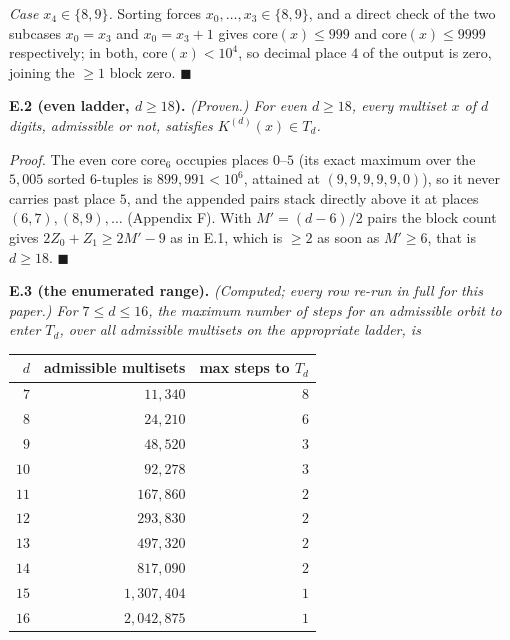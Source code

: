 \documentclass[11pt,letterpaper]{article}
\theoremstyle{paperstyle}
\theoremstyle{paperstyledef}
\theoremstyle{paperstylerem}
\begin{document}
\emph{Case \(x_4 \in \{8, 9\}\).} Sorting forces \(x_0, \dots, x_3 \in \{8, 9\}\), and a direct check of the two subcases \(x_0 = x_3\) and \(x_0 = x_3 + 1\) gives \(\mathrm{core}(x) \leq 999\) and \(\mathrm{core}(x) \leq 9999\) respectively; in both, \(\mathrm{core}(x) < 10^4\), so decimal place \(4\) of the output is zero, joining the \(\geq 1\) block zero. \(\blacksquare\)

\textbf{E.2 (even ladder, \(d \geq 18\)).} \emph{(Proven.) For even \(d \geq 18\), every multiset \(x\) of \(d\) digits, admissible or not, satisfies \(K^{(d)}(x) \in T_d\).}

\emph{Proof.} The even core \(\mathrm{core}_6\) occupies places \(0\)--\(5\) (its exact maximum over the \(5{,}005\) sorted \(6\)-tuples is \(899{,}991 < 10^6\), attained at \((9,9,9,9,9,0)\)), so it never carries past place \(5\), and the appended pairs stack directly above it at places \((6,7), (8,9), \dots\) (Appendix F). With \(M' = (d-6)/2\) pairs the block count gives \(2Z_0 + Z_1 \geq 2M' - 9\) as in E.1, which is \(\geq 2\) as soon as \(M' \geq 6\), that is \(d \geq 18\). \(\blacksquare\)

\textbf{E.3 (the enumerated range).} \emph{(Computed; every row re-run in full for this paper.) For \(7 \leq d \leq 16\), the maximum number of steps for an admissible orbit to enter \(T_d\), over all admissible multisets on the appropriate ladder, is}

{\def\LTcaptype{none} %
\begin{longtable}[]{@{}rrr@{}}
\toprule\noalign{}
\(d\) & admissible multisets & max steps to \(T_d\) \\
\midrule\noalign{}
\endhead
\bottomrule\noalign{}
\endlastfoot
\(7\) & \(11{,}340\) & \(8\) \\
\(8\) & \(24{,}210\) & \(6\) \\
\(9\) & \(48{,}520\) & \(3\) \\
\(10\) & \(92{,}278\) & \(3\) \\
\(11\) & \(167{,}860\) & \(2\) \\
\(12\) & \(293{,}830\) & \(2\) \\
\(13\) & \(497{,}320\) & \(2\) \\
\(14\) & \(817{,}090\) & \(2\) \\
\(15\) & \(1{,}307{,}404\) & \(1\) \\
\(16\) & \(2{,}042{,}875\) & \(1\) \\
\end{longtable}
}
\end{document}
